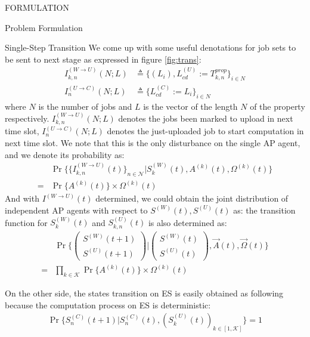 \documentclass[10pt, conference, letterpaper]{IEEEtran}
\begin{document}
\begin{section}{FORMULATION}
\begin{subsection}{Problem Formulation}
\begin{subsubsection}{Single-Step Transition}
                We come up with some useful denotations for job sets to be sent to next stage as expressed in figure \ref{fig:trans}:
                \begin{align}
                    I^{(W \to U)}_{k,n}(N;L) &\triangleq \{ (L_i),L^{(U)}_{cd}:=T^{prop}_{k,n} \}_{i \in N}
                    \\
                    I^{(U \to C)}_{n}(N;L) &\triangleq \{ L^{(C)}_{cd}:=L_i \}_{i \in N}
                \end{align}
                where $N$ is the number of jobs and $L$ is the vector of the length $N$ of the property respectively. $I^{(W \to U)}_{k,n}(N;L)$ denotes the jobs been marked to upload in next time slot, $I^{(U \to C)}_{n}(N;L)$ denotes the just-uploaded job to start computation in next time slot. We note that this is the only disturbance on the single AP agent, and we denote its probability as:
                \begin{align}
                    & \Pr\{ \{I^{(W \to U)}_{k,n}(t)\}_{n \in \mathcal{N}} | S_{k}^{(W)}(t), A^{(k)}(t), \Omega^{(k)}(t) \} \nonumber\\
                    = & \Pr\{ A^{(k)}(t) \} \times \Omega^{(k)}(t)
                \end{align}
                And with $I^{(W \to U)}(t)$ determined, we could obtain the joint distribution of independent AP agents with respect to $S^{(W)}(t),S^{(U)}(t)$ as:
                the transition function for $S^{(W)}_{k}(t)$ and $S^{(U)}_{k,n}(t)$ is also determined as:
                \begin{align}
                    & \Pr\{
                        \begin{pmatrix}
                            S^{(W)}(t+1) \\ S^{(U)}(t+1)
                        \end{pmatrix}
                        |
                        \begin{pmatrix}
                            S^{(W)}(t) \\ S^{(U)}(t)
                        \end{pmatrix}, \vec{A}(t), \vec{\Omega}(t)
                    \}
                    \nonumber\\
                    = & \prod_{k \in \mathcal{K}} \Pr\{ A^{(k)}(t) \} \times \Omega^{(k)}(t)
                \end{align}

                On the other side, the states transition on ES is easily obtained as following because the computation process on ES is deterministic:
                \begin{align}
                    \Pr\{ S_{n}^{(C)}(t+1) |S_{n}^{(C)}(t), (S_{k}^{(U)}(t))_{k \in [1,\mathcal{K}]} \} = 1
                \end{align}


\end{subsubsection}
\end{subsection}
\end{section}
\end{document}
